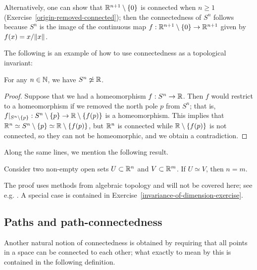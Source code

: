 Alternatively, one can show that $\mathbb{R}^{n+1} \setminus \{0\}$ is connected when $n \geq 1$ (Exercise~\ref{origin-removed-connected}); then the connectedness of $S^n$ follows because $S^n$ is the image of the continuous map $f : \mathbb{R}^{n+1} \setminus \{0 \} \to \mathbb{R}^{n+1}$ given by $f(x) = x/\lVert x \rVert$.

The following is an example of how to use connectedness as a topological invariant:
\begin{prop}
  For any $n \in \mathbb{N}$, we have $S^n \not\simeq \mathbb{R}$.
\end{prop}
\begin{proof}
  Suppose that we had a homeomorphism $f : S^n \to \mathbb{R}$. Then $f$ would restrict to a homeomorphism if we removed the north pole $p$ from $S^n$; that is, $f|_{S^n \setminus \{p \}} : S^n \setminus \{p\} \to \mathbb{R} \setminus \{f(p)\}$ is a homeomorphism. This implies that $\mathbb{R}^n \simeq S^n \setminus \{p\} \simeq \mathbb{R} \setminus \{f(p)\}$, but $\mathbb{R}^n$ is connected while $\mathbb{R} \setminus \{f(p)\}$ is not connected, so they can not be homeomorphic, and we obtain a contradiction.
\end{proof}

Along the same lines, we mention the following result.
\begin{thm}
  \label{invariance-of-dimension}
  Consider two non-empty open sets $U \subset \mathbb{R}^n$ and $V \subset \mathbb{R}^m$. If $U \simeq V$, then $n = m$.
\end{thm}
The proof uses methods from algebraic topology and will not be covered here; see e.g. \cite[Thm.~2.26]{Hat}. A special case is contained in Exercise~\ref{invariance-of-dimension-exercise}.


\subsection{Paths and path-connectedness}
Another natural notion of connectedness is obtained by requiring that all points in a space can be connected to each other; what exactly to mean by this is contained in the following definition.

